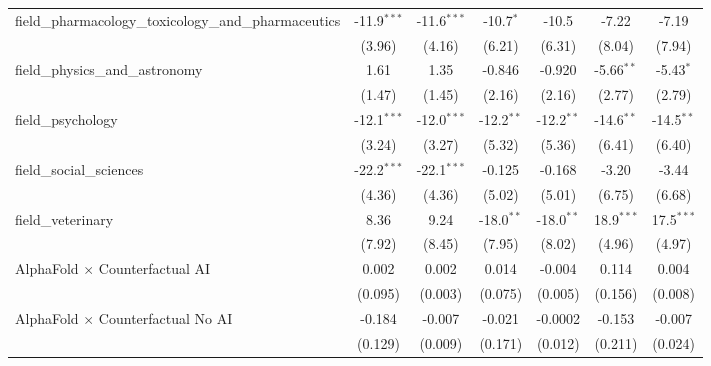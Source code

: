 \begin{tabular}{lcccccc}
   field\_pharmacology\_toxicology\_and\_pharmaceutics         & -11.9$^{***}$ & -11.6$^{***}$ & -10.7$^{*}$   & -10.5         & -7.22         & -7.19\\   
                                                               & (3.96)        & (4.16)        & (6.21)        & (6.31)        & (8.04)        & (7.94)\\   
   field\_physics\_and\_astronomy                              & 1.61          & 1.35          & -0.846        & -0.920        & -5.66$^{**}$  & -5.43$^{*}$\\   
                                                               & (1.47)        & (1.45)        & (2.16)        & (2.16)        & (2.77)        & (2.79)\\   
   field\_psychology                                           & -12.1$^{***}$ & -12.0$^{***}$ & -12.2$^{**}$  & -12.2$^{**}$  & -14.6$^{**}$  & -14.5$^{**}$\\   
                                                               & (3.24)        & (3.27)        & (5.32)        & (5.36)        & (6.41)        & (6.40)\\   
   field\_social\_sciences                                     & -22.2$^{***}$ & -22.1$^{***}$ & -0.125        & -0.168        & -3.20         & -3.44\\   
                                                               & (4.36)        & (4.36)        & (5.02)        & (5.01)        & (6.75)        & (6.68)\\   
   field\_veterinary                                           & 8.36          & 9.24          & -18.0$^{**}$  & -18.0$^{**}$  & 18.9$^{***}$  & 17.5$^{***}$\\   
                                                               & (7.92)        & (8.45)        & (7.95)        & (8.02)        & (4.96)        & (4.97)\\   
   AlphaFold $\times$ Counterfactual AI                        & 0.002         & 0.002         & 0.014         & -0.004        & 0.114         & 0.004\\   
                                                               & (0.095)       & (0.003)       & (0.075)       & (0.005)       & (0.156)       & (0.008)\\   
   AlphaFold $\times$ Counterfactual No AI                     & -0.184        & -0.007        & -0.021        & -0.0002       & -0.153        & -0.007\\   
                                                               & (0.129)       & (0.009)       & (0.171)       & (0.012)       & (0.211)       & (0.024)\\   

\end{tabular}
